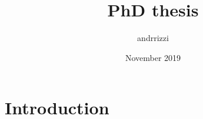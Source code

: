 \documentclass{article}
\title{PhD thesis}
\author{andrrizzi }
\date{November 2019}
\begin{document}
\maketitle

\section{Introduction}
\end{document}
